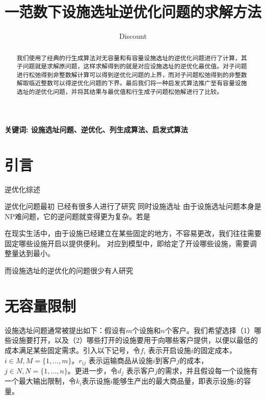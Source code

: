 \documentclass[UTF8]{article}
\author {Dis\cdot count}
\title {一范数下设施选址逆优化问题的求解方法}
\date{}
\begin{document}
    \maketitle

\begin{abstract}

我们使用了经典的行生成算法对无容量和有容量设施选址的逆优化问题进行了计算，其子问题就是求解原问题，这样求解得到的就是对应设施选址的逆优化最优值。对子问题进行松弛得到非整数解计算可以得到逆优化问题的上界，而对子问题松弛得到的非整数解取临近整数可以得逆优化问题的下界。最后我们将一种启发式算法推广至有容量设施选址的逆优化问题，并将其结果与最优值和行生成子问题松弛解进行了比较。

\end{abstract}

\qquad \textbf{关键词: 设施选址问题、逆优化、列生成算法、启发式算法}

\section{引言}  %
逆优化综述

逆优化问题最初
已经有很多人进行了研究
同时设施选址
由于设施选址问题本身是NP难问题，它的逆问题就变得更为复杂。若是

在现实生活中，由于设施已经建立在某些固定的地方，不容易更改，我们往往需要固定哪些设施开启以提供便利。
对应到模型中，即给定了开设哪些设施，需要调整量达到最小。

而设施选址的逆优化的问题很少有人研究

\section{无容量限制}

设施选址问题通常被提出如下：假设有$m$个设施和$n$个客户。我们希望选择（1）哪些设施要打开，以及（2）哪些打开的设施要用于向哪些客户提供，以便以最低的成本满足某些固定需求。引入以下记号，令$f_i$ 表示开启设施$i$的固定成本，$i \in M, M=\{1,\ldots,m\}$。$r_{ij}$ 表示运输商品从设施$i$到客户$j$的成本，$j \in N, N=\{1,\ldots,n\}$。更进一步，令$d_j$ 表示客户$j$的需求，并且假设每一个设施有一个最大输出限制，令$k_i$表示设施$i$能够生产出的最大商品量，即表示设施$i$的容量。
\end{document}
